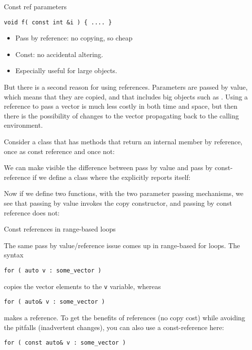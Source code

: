 \begin{slide}{Const ref parameters}
  \label{sl:const-ref}
\begin{lstlisting}
void f( const int &i ) { .... }
\end{lstlisting}
\begin{itemize}
\item Pass by reference: no copying, so cheap
\item Const: no accidental altering.
\item Especially useful for large objects.
\end{itemize}

\end{slide}

But there is a second reason for using references. Parameters are
passed by value, which means that they are copied, and that includes
big objects such as . Using a reference to pass a
vector is much less costly in both time and space, but then there is the
possibility of changes to the vector propagating back to the calling
environment.

Consider a class that has methods that return an internal member by
reference, once as const reference and once not:
%

We can make visible the difference between pass by value and pass by
const-reference if we define a class where the
 explicitly reports itself:
%
  
Now if we define two functions, with the two parameter passing
mechanisms, we see that passing by value invokes the copy constructor,
and passing by const reference does not:
%

 {Const references in range-based loops}

The same pass by value/reference issue comes up in range-based for
loops. The syntax
\begin{lstlisting}
for ( auto v : some_vector )
\end{lstlisting}
copies the vector elements to the \lstinline{v} variable, whereas
\begin{lstlisting}
for ( auto& v : some_vector )
\end{lstlisting}
makes a reference. To get the benefits of references (no copy cost)
while avoiding the pitfalls (inadvertent changes), you can also use a
const-reference here:
\begin{lstlisting}
for ( const auto& v : some_vector )
\end{lstlisting}

